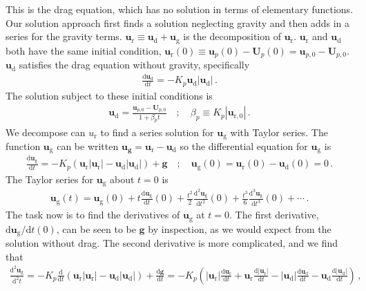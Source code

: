 This is the drag equation, which has no solution in terms of elementary functions. Our solution approach first finds a solution neglecting gravity and then adds in a series for the gravity terms. $\mathbf{u}_\text{r} \equiv \mathbf{u}_\text{d} + \mathbf{u}_\text{g}$ is the decomposition of $\mathbf{u}_\text{r}$. $\mathbf{u}_\text{r}$ and $\mathbf{u}_\text{d}$ both have the same initial condition, $\mathbf{u}_\text{r}(0) \equiv \mathbf{u}_p(0) - \mathbf{U}_p(0) = \mathbf{u}_{p,0} - \mathbf{U}_{p,0}$. $\mathbf{u}_\text{d}$ satisfies the drag equation without gravity, specifically
\begin{align}
    \frac{\text{d} \mathbf{u}_\text{d}}{\text{d} t} = -K_p \mathbf{u}_\text{d} |\mathbf{u}_\text{d}| \,.
\end{align}
The solution subject to these initial conditions is
\begin{align}
    \label{ud_exact}
    \mathbf{u}_\text{d} = \frac{\mathbf{u}_{p,0} - \mathbf{U}_{p,0}}{1 + \beta_p t} \quad ; \quad \beta_p \equiv K_p |\mathbf{u}_{\text{r},0}| \,.
\end{align}
We decompose can $u_\text{r}$ to find a series solution for $\mathbf{u}_\text{g}$ with Taylor series. The function $\mathbf{u}_\text{g}$ can be written $\mathbf{u_g} = \mathbf{u}_\text{r} - \mathbf{u}_\text{d}$ so the differential equation for $\mathbf{u}_\text{g}$ is
\begin{align}
    \frac{\text{d} \mathbf{u}_\text{g}}{\text{d} t} = -K_p (\mathbf{u}_\text{r} |\mathbf{u}_\text{r}| - \mathbf{u}_\text{d} |\mathbf{u}_\text{d}|) + \mathbf{g} \quad ; \quad \mathbf{u}_\text{g}(0) = \mathbf{u}_\text{r}(0) - \mathbf{u}_\text{d}(0) = 0 \,.
\end{align}
The Taylor series for $\mathbf{u}_\text{g}$ about $t = 0$ is
\begin{align}
    \mathbf{u}_\text{g}(t) = \mathbf{u}_\text{g}(0) + t \frac{\text{d} \mathbf{u}_\text{g}}{\text{d} t}(0) + \frac{t^2}{2} \frac{\text{d}^2 \mathbf{u}_\text{g}}{\text{d} t^2}(0) + \frac{t^3}{6} \frac{\text{d}^3 \mathbf{u}_\text{g}}{\text{d} t^3}(0) + \cdots \,.
\end{align}
The task now is to find the derivatives of $\mathbf{u}_\text{g}$ at $t = 0$. The first derivative, $\text{d} \mathbf{u}_\text{g} / \text{d} t(0)$, can be seen to be $\mathbf{g}$ by inspection, as we would expect from the solution without drag. The second derivative is more complicated, and we find that
\begin{align*}
    \frac{\text{d}^2 \mathbf{u}_\text{g}}{\text{d}^2 t} = -K_p \frac{\text{d}}{\text{d} t}(\mathbf{u}_\text{r} |\mathbf{u}_\text{r}| - \mathbf{u}_\text{d} |\mathbf{u}_\text{d}|) + \frac{\text{d} \mathbf{g}}{\text{d} t} = -K_p \left(|\mathbf{u}_\text{r}| \frac{\text{d} \mathbf{u}_\text{r}}{\text{d} t} + \mathbf{u}_\text{r} \frac{\text{d} |\mathbf{u}_\text{r}|}{\text{d} t} - |\mathbf{u}_\text{d}| \frac{\text{d} \mathbf{u}_\text{d}}{\text{d} t} - \mathbf{u}_\text{d} \frac{\text{d} |\mathbf{u}_\text{d}|}{\text{d} t}\right) \,,
\end{align*}
